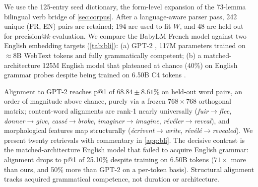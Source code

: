 \documentclass[11pt]{article}
\begin{document}
We use the 125-entry seed dictionary, the form-level expansion of the 73-lemma bilingual verb bridge of \autoref{sec:corpus}. After a language-aware parser pass, 242 unique (FR, EN) pairs are retained; 194 are used to fit $W$, and 48 are held out for precision@$k$ evaluation. We compare the BabyLM French model against two English embedding targets (\autoref{tab:bli}): (a) GPT-2 \citep{radford2019gpt2}, 117M parameters trained on $\approx\!8$B WebText tokens and fully grammatically competent; (b) a matched-architecture 125M English model that plateaued at chance (40\%) on English grammar probes despite being trained on 6.50B C4 tokens \citep{wasserman2026scaling}.

\begin{table}[t]
\centering
{}
\caption{BLI Procrustes alignment from the BabyLM French model to two English embedding spaces. The GPT-2 row reports mean $\pm$ std across the 5-seed reproduction (\autoref{sec:arch}); the matched-arch failed-EN row is from the submitted run only. Fit $\;= 1 - \|E_{\mathrm{FR}}W - E_{\mathrm{EN}}\|_F^2 / \|E_{\mathrm{EN}}\|_F^2$ (1.00 perfect, 0.00 no alignment); p@k is held-out word-translation precision at the $k$ nearest neighbours under the learned map.}
\label{tab:bli}
\vspace{-1.25em}
\end{table}

Alignment to GPT-2 reaches p@1 of $68.84 \pm 8.61$\% on held-out word pairs, an order of magnitude above chance, purely via a frozen $768 \times 768$ orthogonal matrix; content-word alignments are rank-1 nearly universally (\emph{fuir}$\to$\emph{flee}, \emph{donner}$\to$\emph{give}, \emph{cassé}$\to$\emph{broke}, \emph{imaginer}$\to$\emph{imagine}, \emph{révéler}$\to$\emph{reveal}), and morphological features map structurally (\emph{écrivent}$\to$\emph{write}, \emph{révélé}$\to$\emph{revealed}). We present twenty retrievals with commentary in \autoref{app:bli}. The decisive contrast is the matched-architecture English model that failed to acquire English grammar: alignment drops to p@1 of 25.10\% despite training on 6.50B tokens ($71\times$ more than ours, and 50\% more than GPT-2 on a per-token basis). Structural alignment tracks acquired grammatical competence, not duration or architecture.
\end{document}
